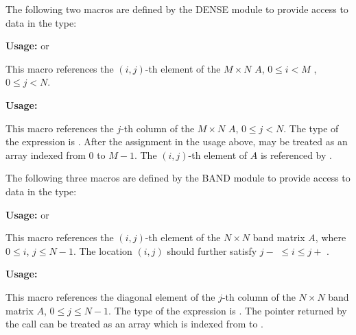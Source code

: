 \documentclass[letterpaper,10pt,english]{sphinxmanual}
\begin{document}
The following two macros are defined by the DENSE module to provide
access to data in the {\hyperref[linear_solvers/DLS:DlsMat]{}} type:

\begin{fulllineitems}
\label{linear_solvers/DLS:DENSE_ELEM}
\textbf{Usage:}   or  

This macro references the $(i,j)$-th element of the $M \times N$
{\hyperref[linear_solvers/DLS:DlsMat]{}} $A$, $0 \le i < M$ , $0 \le j < N$.

\end{fulllineitems}


\begin{fulllineitems}
\label{linear_solvers/DLS:DENSE_COL}
\textbf{Usage:} 

This macro references the $j$-th column of the $M \times N$
{\hyperref[linear_solvers/DLS:DlsMat]{}} $A$, $0 \le j < N$. The type of the
expression  is  . After the
assignment in the usage above,  may be treated as an
array indexed from 0 to $M-1$. The $(i,j)$-th
element of $A$ is referenced by .

\end{fulllineitems}


The following three macros are defined by the BAND module to provide
access to data in the {\hyperref[linear_solvers/DLS:DlsMat]{}} type:

\begin{fulllineitems}
\label{linear_solvers/DLS:BAND_ELEM}
\textbf{Usage:}   or  

This macro references the $(i,j)$-th element of the $N \times N$
band matrix $A$, where $0 \le i$, $j \le N-1$.
The location $(i,j)$ should further satisfy $j-$
 $\le i \le j+$ .

\end{fulllineitems}


\begin{fulllineitems}
\label{linear_solvers/DLS:BAND_COL}
\textbf{Usage:} 

This macro references the diagonal element of the $j$-th column of the
$N \times N$ band matrix $A$, $0 \le j \le
N-1$. The type of the expression  is
. The pointer returned by the call 
can be treated as an array which is indexed from  to
.

\end{fulllineitems}
\end{document}
